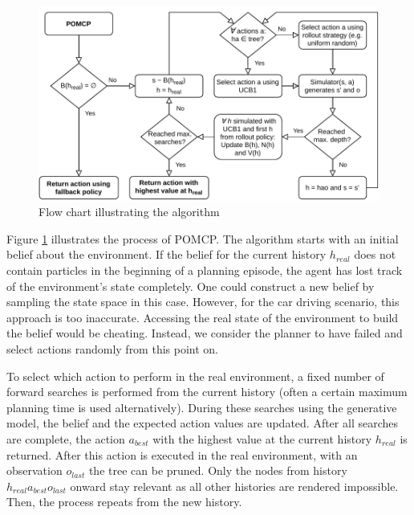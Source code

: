 \begin{figure}[htbp]
    \centerfloat
    \includegraphics[width=1.0\textwidth]{figures/POMCP.pdf}
    \caption{Flow chart illustrating the  algorithm}
    \label{fig:pomcp}
\end{figure}

Figure \ref{fig:pomcp} illustrates the process of POMCP. The algorithm starts with an initial belief about the environment. If the belief for the current history $h_{real}$ does not contain particles in the beginning of a planning episode, the agent has lost track of the environment's state completely. One could construct a new belief by sampling the state space in this case. However, for the car driving scenario, this approach is too inaccurate. Accessing the real state of the environment to build the belief would be cheating. Instead, we consider the planner to have failed and select actions randomly from this point on.

To select which action to perform in the real environment, a fixed number of forward searches is performed from the current history (often a certain maximum planning time is used alternatively). During these searches using the generative model, the belief and the expected action values are updated. After all searches are complete, the action $a_{best}$ with the highest value at the current history $h_{real}$ is returned. After this action is executed in the real environment, with an observation $o_{last}$ the tree can be pruned. Only the nodes from history $h_{real}a_{best}o_{last}$ onward stay relevant as all other histories are rendered impossible. Then, the process repeats from the new history.

